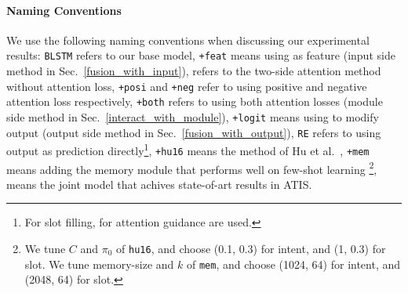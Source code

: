 \paragraph{Naming Conventions}
We use the following naming conventions when discussing our experimental results:
%
\texttt{BLSTM} refers to our base model,
\texttt{+feat} means using \REtag as feature (input side method in Sec.~\ref{fusion_with_input}),
\ptatt refers to the two-side attention method without attention loss,
\texttt{+posi} and \texttt{+neg} refer to using positive and negative attention loss respectively, \texttt{+both} refers to using both attention losses (\NN module side method in Sec.~\ref{interact_with_module}),
\texttt{+logit} means using \REtag to modify \NN output (output side method in Sec.~\ref{fusion_with_output}),
\texttt{RE} refers to using \RE output as prediction directly\footnote{
For slot filling, \REs for attention guidance are used.},
\texttt{+hu16} means the method of Hu et al.~,
\texttt{+mem} means adding the memory module that performs well on few-shot learning \cite{kaiser2017learning}\footnote{
We tune $C$ and $\pi_0$ of \texttt{hu16}, and choose (0.1, 0.3) for intent, and (1, 0.3) for slot. We tune memory-size and $k$ of \texttt{mem}, and choose (1024, 64) for intent, and (2048, 64) for slot.
},
\LL means the joint model \cite{liu2016attention} that achives state-of-art results in ATIS.
